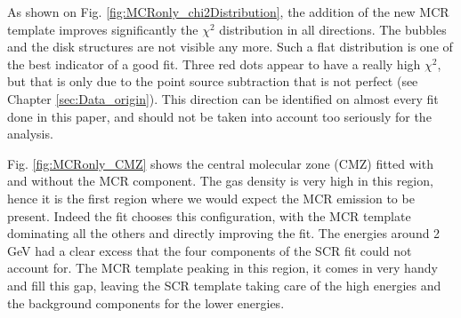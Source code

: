
As shown on Fig. \ref{fig:MCRonly_chi2Distribution}, the addition of the new MCR template improves significantly the $\chi^2$ distribution in all directions. The bubbles and the disk structures are not visible any more. Such a flat distribution is one of the best indicator of a good fit.
Three red dots appear to have a really high $\chi^2$, but that is only due to the point source subtraction that is not perfect (see Chapter \ref{sec:Data_origin}). This direction can be identified on almost every fit done in this paper, and should not be taken into account too seriously for the analysis.


Fig. \ref{fig:MCRonly_CMZ} shows the central molecular zone (CMZ) fitted with and without the MCR component. The gas density is very high in this region, hence it is the first region where we would expect the MCR emission to be present. 
Indeed the fit chooses this configuration, with the MCR template dominating all the others and directly improving the fit. The energies around 2 GeV had a clear excess that the four components of the SCR fit could not account for. The MCR template peaking in this region, it comes in very handy and fill this gap, leaving the SCR template taking care of the high energies and the background components for the lower energies.



